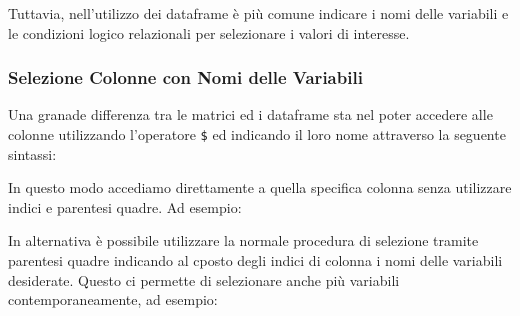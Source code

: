 \documentclass[
]{book}
\newenvironment{Shaded}{\begin{snugshade}}{\end{snugshade}}
\newcommand{\CommentTok}[1]{\textcolor[rgb]{0.56,0.35,0.01}{\textit{#1}}}
\newcommand{\NormalTok}[1]{#1}
\newcommand{\OperatorTok}[1]{\textcolor[rgb]{0.81,0.36,0.00}{\textbf{#1}}}
\begin{document}
Tuttavia, nell'utilizzo dei dataframe è più comune indicare i nomi delle variabili e le condizioni logico relazionali per selezionare i valori di interesse.

\hypertarget{selezione-colonne-con-nomi-delle-variabili}{%
\subsubsection*{Selezione Colonne con Nomi delle Variabili}\label{selezione-colonne-con-nomi-delle-variabili}}

Una granade differenza tra le matrici ed i dataframe sta nel poter accedere alle colonne utilizzando l'operatore \texttt{\$} ed indicando il loro nome attraverso la seguente sintassi:

\begin{Shaded}
\end{Shaded}

In questo modo accediamo direttamente a quella specifica colonna senza utilizzare indici e parentesi quadre. Ad esempio:

\begin{Shaded}
\end{Shaded}

In alternativa è possibile utilizzare la normale procedura di selezione tramite parentesi quadre indicando al cposto degli indici di colonna i nomi delle variabili desiderate. Questo ci permette di selezionare anche più variabili contemporaneamente, ad esempio:
\end{document}
